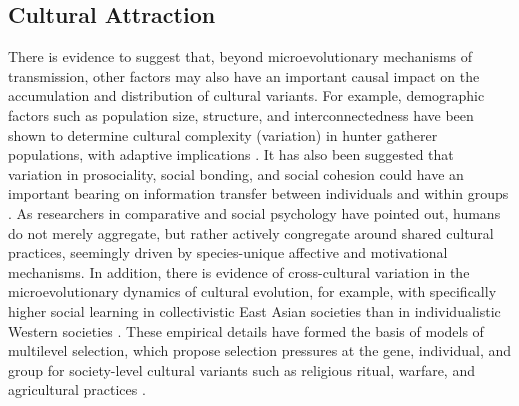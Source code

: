 \subsection{Cultural Attraction}
There is evidence to suggest that, beyond microevolutionary mechanisms of transmission, other factors may also have an important causal impact on the accumulation and distribution of cultural variants. For example, demographic factors such as population size, structure, and interconnectedness have been shown to determine cultural complexity (variation) in hunter gatherer populations, with adaptive implications \citep{Henrich2004}. It has also been suggested that variation in prosociality, social bonding, and social cohesion could have an important bearing on information transfer between individuals and within groups \citep{Heyes2011,Whitehouse2014,Wheatley2016}.  As researchers in comparative and social psychology have pointed out, humans do not merely aggregate, but rather actively congregate around shared cultural practices, seemingly driven by species-unique affective and motivational mechanisms\citep{Dunbar2010,Tomasello2005a}.  In addition, there is evidence of cross-cultural variation in the microevolutionary dynamics of cultural evolution, for example, with specifically higher social learning in collectivistic East Asian societies than in individualistic Western societies \citep{Mesoudi2015,DiYanni2015}.  These empirical details have formed the basis of models of multilevel selection, which propose selection pressures at the gene, individual, and group for society-level cultural variants such as religious ritual, warfare, and agricultural practices  \citep{Turchin2013,Atkinson2011a}.

